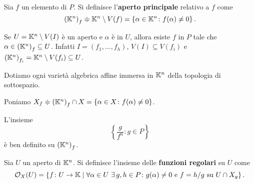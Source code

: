 \begin{definition}
    Sia $f$ un elemento di $P$. Si definisce l'\textbf{aperto principale} relativo a $f$ come
	\[\left(\mathbb{K}^n\right)_f\doteqdot \mathbb{K}^n\setminus V(f)=\left\{\alpha\in \mathbb{K}^n \colon f(\alpha)\ne 0\right\}.\] 
\end{definition}
\begin{remark}
Se $U=\mathbb{K}^n\setminus V(I)$ è un aperto e $\alpha$ è in $U$, allora esiste $f$ in $P$ tale che $\alpha\in\left(\mathbb{K}^n\right)_f\subseteq U$. Infatti $I=(f_1,\dots,f_h)$, $V(I)\subseteq V(f_i)$ e $\left(\mathbb{K}^n\right)_{f_i}=\mathbb{K}^n\setminus V(f_i) \subseteq U$.
\end{remark}

\noindent Dotiamo ogni varietà algebrica affine immersa in $\mathbb{K}^n$ della topologia di sottospazio. 

\begin{notation}
Poniamo $X_f\doteqdot\left(\mathbb{K}^n\right)_f\cap X=\{\alpha\in X \colon f(\alpha)\ne 0\}$.
\end{notation} 

\begin{remark}
    L'insieme \[\left\{\frac{g}{f^n} \colon g\in P\right\}\] è ben definito su $\left(\mathbb{K}^n\right)_f$.
\end{remark}

\begin{definition}
    Sia $U$ un aperto di $\mathbb{K}^n$. Si definisce l'insieme delle \textbf{funzioni regolari} su $U$ come \[\mathcal{O}_X(U)=\left\{f\colon U \to \mathbb{K} \mid \forall \alpha \in U \ \exists\,g,h\in P\colon g(\alpha)\ne0 \text{ e } f=h/g \text{ su } U\cap X_g\right\}.\]
\end{definition}


